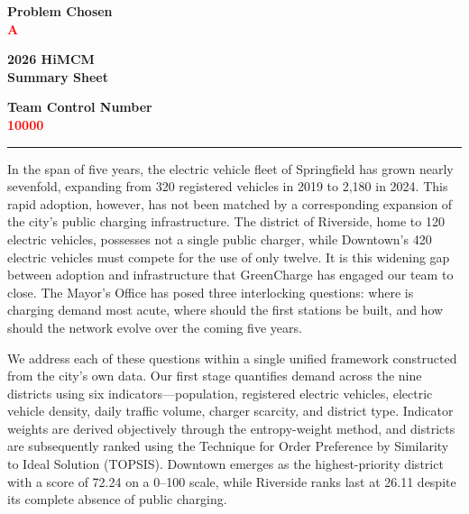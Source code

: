 \documentclass[11pt]{article}
\begin{document}
\thispagestyle{empty}

\vspace*{-20pt}
\noindent
\begin{minipage}[c]{0.32\textwidth}
\centering
\textbf{Problem Chosen}\\[3pt]
{\Large\textcolor{red}{\textbf{A}}}
\end{minipage}%
\begin{minipage}[c]{0.34\textwidth}
\centering
\textbf{2026 HiMCM}\\[3pt]
\textbf{Summary Sheet}
\end{minipage}%
\begin{minipage}[c]{0.34\textwidth}
\centering
\textbf{Team Control Number}\\[3pt]
{\Large\textcolor{red}{\textbf{10000}}}
\end{minipage}

\vspace{6pt}
\hrule
\vspace{12pt}

In the span of five years, the electric vehicle fleet of Springfield has grown nearly sevenfold, expanding from 320 registered vehicles in 2019 to 2,180 in 2024. This rapid adoption, however, has not been matched by a corresponding expansion of the city's public charging infrastructure. The district of Riverside, home to 120 electric vehicles, possesses not a single public charger, while Downtown's 420 electric vehicles must compete for the use of only twelve. It is this widening gap between adoption and infrastructure that GreenCharge has engaged our team to close. The Mayor's Office has posed three interlocking questions: where is charging demand most acute, where should the first stations be built, and how should the network evolve over the coming five years.

We address each of these questions within a single unified framework constructed from the city's own data. Our first stage quantifies demand across the nine districts using six indicators—population, registered electric vehicles, electric vehicle density, daily traffic volume, charger scarcity, and district type. Indicator weights are derived objectively through the entropy-weight method, and districts are subsequently ranked using the Technique for Order Preference by Similarity to Ideal Solution (TOPSIS). Downtown emerges as the highest-priority district with a score of 72.24 on a 0–100 scale, while Riverside ranks last at 26.11 despite its complete absence of public charging.
\end{document}
